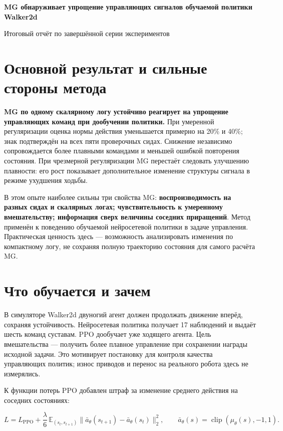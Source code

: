\documentclass[10pt,a4paper]{article}
\begin{document}
{\Large\bfseries MG обнаруживает упрощение управляющих сигналов обучаемой политики Walker2d}\par\medskip

Итоговый отчёт по завершённой серии экспериментов

\section*{Основной результат и сильные стороны метода}

\textbf{MG по одному скалярному логу устойчиво реагирует на упрощение управляющих команд при дообучении политики.} При умеренной регуляризации оценка нормы действия уменьшается примерно на 20\% и 40\%; знак подтверждён на всех пяти проверочных сидах. Снижение независимо сопровождается более плавными командами и меньшей ошибкой повторения состояния. При чрезмерной регуляризации MG перестаёт следовать улучшению плавности: его рост показывает дополнительное изменение структуры сигнала в режиме ухудшения ходьбы.

В этом опыте наиболее сильны три свойства MG: \textbf{воспроизводимость на разных сидах и скалярных логах; чувствительность к умеренному вмешательству; информация сверх величины соседних приращений}. Метод применён к поведению обучаемой нейросетевой политики в задаче управления. Практическая ценность здесь --- возможность анализировать изменения по компактному логу, не сохраняя полную траекторию состояния для самого расчёта MG.

\section*{Что обучается и зачем}

В симуляторе Walker2d двуногий агент должен продолжать движение вперёд, сохраняя устойчивость. Нейросетевая политика получает 17 наблюдений и выдаёт шесть команд суставам. PPO дообучает уже ходящего агента. Цель вмешательства --- получить более плавное управление при сохранении награды исходной задачи. Это мотивирует постановку для контроля качества управляющих политик; износ приводов и перенос на реального робота здесь не измерялись.

К функции потерь PPO добавлен штраф за изменение среднего действия на соседних состояниях:

\[
L=L_{\mathrm{PPO}}+\frac{\lambda}{6}\,\mathbb{E}_{(s_t,s_{t+1})}
\|\bar a_\theta(s_{t+1})-\bar a_\theta(s_t)\|_2^2,
\qquad \bar a_\theta(s)=\operatorname{clip}(\mu_\theta(s),-1,1).
\]
\end{document}
